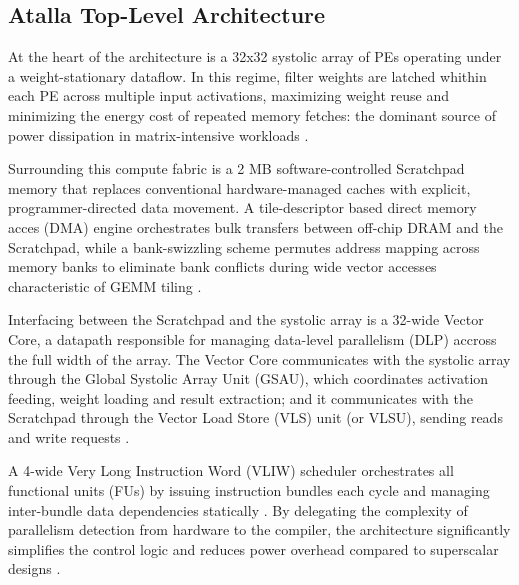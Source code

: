 
\subsection{Atalla Top-Level Architecture}

At the heart of the architecture is a 32x32 systolic array of PEs operating under a weight-stationary dataflow. In this regime, filter weights are latched whithin each PE across multiple input activations, maximizing weight reuse and minimizing the energy cost of repeated memory fetches: the dominant source of power dissipation in matrix-intensive workloads \cite{efficientprocessingofdnn, sysarrfinalreport}.

Surrounding this compute fabric is a 2 MB software-controlled Scratchpad memory that replaces conventional hardware-managed caches with explicit, programmer-directed data movement. A tile-descriptor based direct memory acces (DMA) engine orchestrates bulk transfers between off-chip DRAM and the Scratchpad, while a bank-swizzling scheme permutes address mapping across memory banks to eliminate bank conflicts during wide vector accesses characteristic of GEMM tiling \cite{scpadfinalreport}.

Interfacing between the Scratchpad and the systolic array is a 32-wide Vector Core, a datapath responsible for managing data-level parallelism (DLP) accross the full width of the array. The Vector Core communicates with the systolic array through the Global Systolic Array Unit (GSAU), which coordinates activation feeding, weight loading and result extraction; and it communicates with the Scratchpad through the Vector Load Store (VLS) unit (or VLSU), sending reads and write requests \cite{vcfinalreport}.

A 4-wide Very Long Instruction Word (VLIW) scheduler orchestrates all functional units (FUs) by issuing instruction bundles each cycle and managing inter-bundle data dependencies statically \cite{schedulerfinalreport}. By delegating the complexity of parallelism detection from hardware to the compiler, the architecture significantly simplifies the control logic and reduces power overhead compared to superscalar designs \cite{simplevliw}.


